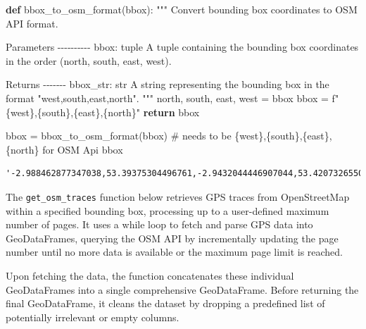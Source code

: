 \documentclass[
  letterpaper,
  DIV=11,
  numbers=noendperiod]{scrreprt}
\newenvironment{Shaded}{\begin{snugshade}}{\end{snugshade}}
\newcommand{\CommentTok}[1]{\textcolor[rgb]{0.37,0.37,0.37}{#1}}
\newcommand{\ControlFlowTok}[1]{\textcolor[rgb]{0.00,0.23,0.31}{\textbf{#1}}}
\newcommand{\KeywordTok}[1]{\textcolor[rgb]{0.00,0.23,0.31}{\textbf{#1}}}
\newcommand{\NormalTok}[1]{\textcolor[rgb]{0.00,0.23,0.31}{#1}}
\newcommand{\OperatorTok}[1]{\textcolor[rgb]{0.37,0.37,0.37}{#1}}
\newcommand{\SpecialCharTok}[1]{\textcolor[rgb]{0.37,0.37,0.37}{#1}}
\newcommand{\SpecialStringTok}[1]{\textcolor[rgb]{0.13,0.47,0.30}{#1}}
\begin{document}
\begin{Shaded}
\begin{Highlighting}[]
\KeywordTok{def}\NormalTok{ bbox\_to\_osm\_format(bbox):}
    \CommentTok{"""}
\CommentTok{    Convert bounding box coordinates to OSM API format.}

\CommentTok{    Parameters}
\CommentTok{    {-}{-}{-}{-}{-}{-}{-}{-}{-}{-}}
\CommentTok{    bbox: tuple}
\CommentTok{        A tuple containing the bounding box coordinates in the order (north, south, east, west).}

\CommentTok{    Returns}
\CommentTok{    {-}{-}{-}{-}{-}{-}{-}}
\CommentTok{    bbox\_str: str}
\CommentTok{        A string representing the bounding box in the format "west,south,east,north".}
\CommentTok{    """}
\NormalTok{    north, south, east, west }\OperatorTok{=}\NormalTok{ bbox}
\NormalTok{    bbox }\OperatorTok{=} \SpecialStringTok{f"}\SpecialCharTok{\{}\NormalTok{west}\SpecialCharTok{\}}\SpecialStringTok{,}\SpecialCharTok{\{}\NormalTok{south}\SpecialCharTok{\}}\SpecialStringTok{,}\SpecialCharTok{\{}\NormalTok{east}\SpecialCharTok{\}}\SpecialStringTok{,}\SpecialCharTok{\{}\NormalTok{north}\SpecialCharTok{\}}\SpecialStringTok{"}
    \ControlFlowTok{return}\NormalTok{ bbox}
\end{Highlighting}
\end{Shaded}

\begin{Shaded}
\begin{Highlighting}[]
\NormalTok{bbox }\OperatorTok{=}\NormalTok{ bbox\_to\_osm\_format(bbox) }\CommentTok{\# needs to be \{west\},\{south\},\{east\},\{north\} for OSM Api}
\NormalTok{bbox}
\end{Highlighting}
\end{Shaded}

\begin{verbatim}
'-2.988462877347038,53.39375304496761,-2.9432044446907044,53.420732655032396'
\end{verbatim}

The \texttt{get\_osm\_traces} function below retrieves GPS traces from
OpenStreetMap within a specified bounding box, processing up to a
user-defined maximum number of pages. It uses a while loop to fetch and
parse GPS data into GeoDataFrames, querying the OSM API by incrementally
updating the page number until no more data is available or the maximum
page limit is reached.

Upon fetching the data, the function concatenates these individual
GeoDataFrames into a single comprehensive GeoDataFrame. Before returning
the final GeoDataFrame, it cleans the dataset by dropping a predefined
list of potentially irrelevant or empty columns.
\end{document}
